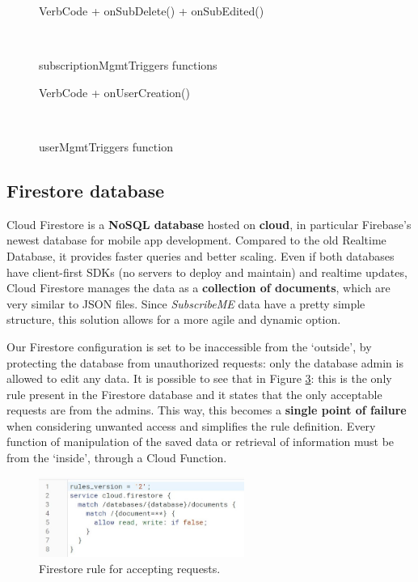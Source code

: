 \documentclass[12pt]{article}
\begin{document}
\begin{figure}[h!]
    \centering
    \begin{SaveVerbatim}{VerbCode}
        + onSubDelete()
        + onSubEdited()
    \end{SaveVerbatim}
    \setlength{\fboxsep}{5mm}
    \caption{subscriptionMgmtTriggers functions}~\label{fig:subtrigger}
\end{figure}

\begin{figure}[h!]
    \centering
    \begin{SaveVerbatim}{VerbCode}
        + onUserCreation()
    \end{SaveVerbatim}
    \setlength{\fboxsep}{5mm}
    \caption{userMgmtTriggers function}~\label{fig:usertrigger}
\end{figure}


\subsection{Firestore database}
Cloud Firestore is a \textbf{NoSQL database} hosted on \textbf{cloud}, in particular Firebase's newest database for mobile app development. Compared to the old Realtime Database, it provides faster queries and better scaling. Even if both databases have client-first SDKs (no servers to deploy and maintain) and realtime updates, Cloud Firestore manages the data as a \textbf{collection of documents}, which are very similar to JSON files. Since \textit{SubscribeME} data have a pretty simple structure, this solution allows for a more agile and dynamic option.

Our Firestore configuration is set to be inaccessible from the `outside', by protecting the database from unauthorized requests: only the database admin is allowed to edit any data. It is possible to see that in Figure \ref{fig:rule}: this is the only rule present in the Firestore database and it states that the only acceptable requests are from the admins. This way, this becomes a \textbf{single point of failure} when considering unwanted access and simplifies the rule definition. Every function of manipulation of the saved data or retrieval of information must be from the `inside', through a Cloud Function.

\begin{figure}[h!]
    \begin{center}
        \includegraphics[width=0.6\textwidth, clip]{../../assets/firestoreRule.jpg}
    \end{center}
    \caption{Firestore rule for accepting requests.}
    \label{fig:rule}
\end{figure}
\end{document}
